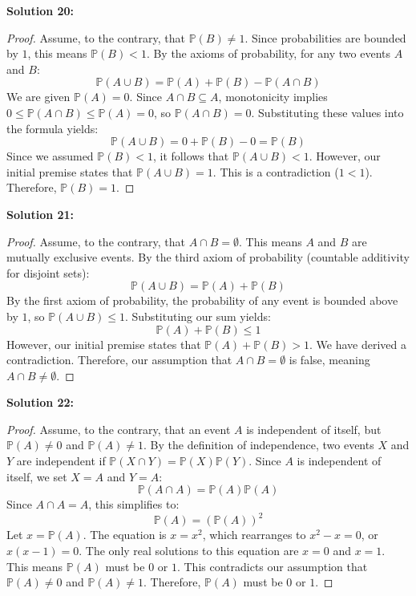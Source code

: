 \documentclass[11pt]{article}
\theoremstyle{definition}
\begin{document}
\textbf{Solution 20:}
\begin{proof}
Assume, to the contrary, that $\mathbb{P}(B) \neq 1$. Since probabilities are bounded by $1$, this means $\mathbb{P}(B) < 1$. By the axioms of probability, for any two events $A$ and $B$:
\[ \mathbb{P}(A \cup B) = \mathbb{P}(A) + \mathbb{P}(B) - \mathbb{P}(A \cap B) \]
We are given $\mathbb{P}(A) = 0$. Since $A \cap B \subseteq A$, monotonicity implies $0 \le \mathbb{P}(A \cap B) \le \mathbb{P}(A) = 0$, so $\mathbb{P}(A \cap B) = 0$. Substituting these values into the formula yields:
\[ \mathbb{P}(A \cup B) = 0 + \mathbb{P}(B) - 0 = \mathbb{P}(B) \]
Since we assumed $\mathbb{P}(B) < 1$, it follows that $\mathbb{P}(A \cup B) < 1$. However, our initial premise states that $\mathbb{P}(A \cup B) = 1$. This is a contradiction ($1 < 1$). Therefore, $\mathbb{P}(B) = 1$.
\end{proof}

\textbf{Solution 21:}
\begin{proof}
Assume, to the contrary, that $A \cap B = \emptyset$. This means $A$ and $B$ are mutually exclusive events. By the third axiom of probability (countable additivity for disjoint sets):
\[ \mathbb{P}(A \cup B) = \mathbb{P}(A) + \mathbb{P}(B) \]
By the first axiom of probability, the probability of any event is bounded above by $1$, so $\mathbb{P}(A \cup B) \le 1$. Substituting our sum yields:
\[ \mathbb{P}(A) + \mathbb{P}(B) \le 1 \]
However, our initial premise states that $\mathbb{P}(A) + \mathbb{P}(B) > 1$. We have derived a contradiction. Therefore, our assumption that $A \cap B = \emptyset$ is false, meaning $A \cap B \neq \emptyset$.
\end{proof}

\textbf{Solution 22:}
\begin{proof}
Assume, to the contrary, that an event $A$ is independent of itself, but $\mathbb{P}(A) \neq 0$ and $\mathbb{P}(A) \neq 1$. By the definition of independence, two events $X$ and $Y$ are independent if $\mathbb{P}(X \cap Y) = \mathbb{P}(X)\mathbb{P}(Y)$. Since $A$ is independent of itself, we set $X = A$ and $Y = A$:
\[ \mathbb{P}(A \cap A) = \mathbb{P}(A)\mathbb{P}(A) \]
Since $A \cap A = A$, this simplifies to:
\[ \mathbb{P}(A) = (\mathbb{P}(A))^2 \]
Let $x = \mathbb{P}(A)$. The equation is $x = x^2$, which rearranges to $x^2 - x = 0$, or $x(x - 1) = 0$. The only real solutions to this equation are $x = 0$ and $x = 1$. This means $\mathbb{P}(A)$ must be $0$ or $1$. This contradicts our assumption that $\mathbb{P}(A) \neq 0$ and $\mathbb{P}(A) \neq 1$. Therefore, $\mathbb{P}(A)$ must be $0$ or $1$.
\end{proof}
\end{document}
